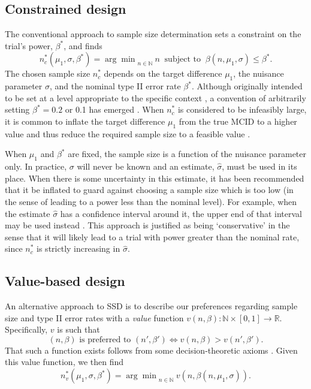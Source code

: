 \documentclass[sagev, Crown]{sagej}
\begin{document}
\subsection{Constrained design}

The conventional approach to sample size determination sets a constraint on the trial's power, $\beta^*$, and finds
\begin{equation}
n^*_c (\mu_1, \sigma, \beta^*) = {\arg\min}_{n \in \mathbb{N}}~ n ~\text{ subject to } ~ \beta(n, \mu_1, \sigma) \leq \beta^*.
\end{equation}
The chosen sample size $n^*_c$ depends on the target difference $\mu_1$, the nuisance parameter $\sigma$, and the nominal type II error rate $\beta^*$. Although originally intended to be set at a level appropriate to the specific context \cite{Neyman1933}, a convention of arbitrarily setting $\beta^* = 0.2$ or 0.1 has emerged \cite{Bacchetti2019}. When $n^*_c$ is considered to be infeasibly large, it is common to inflate the target difference $\mu_1$ from the true MCID to a higher value and thus reduce the required sample size to a feasible value \cite{Schulz2005}.

When $\mu_1$ and $\beta^*$ are fixed, the sample size is a function of the nuisance parameter only. In practice, $\sigma$ will never be known and an estimate, $\hat{\sigma}$, must be used in its place. When there is some uncertainty in this estimate, it has been recommended that it be inflated to guard against choosing a sample size which is too low (in the sense of leading to a power less than the nominal level). For example, when the estimate $\hat{\sigma}$ has a confidence interval around it, the upper end of that interval may be used instead \cite{Browne1995, Teare2014}. This approach is justified as being `conservative' in the sense that it will likely lead to a trial with power greater than the nominal rate, since $n^*_c$ is strictly increasing in $\hat{\sigma}$. 

\subsection{Value-based design}

An alternative approach to SSD is to describe our preferences regarding sample size and type II error rates with a \emph{value} function $v(n, \beta): \mathbb{N} \times [0,1] \rightarrow \mathbb{R}$. Specifically, $v$ is such that
$$
(n, \beta) \text{ is preferred to }(n', \beta') \Leftrightarrow v(n, \beta) > v(n', \beta').
$$
That such a function exists follows from some decision-theoretic axioms \cite{French2000}. Given this value function, we then find
$$
n^*_v (\mu_1, \sigma, \beta^*) = {\arg\min}_{n \in \mathbb{N}}~ v(n, \beta(n, \mu_1, \sigma)).
$$
\end{document}
